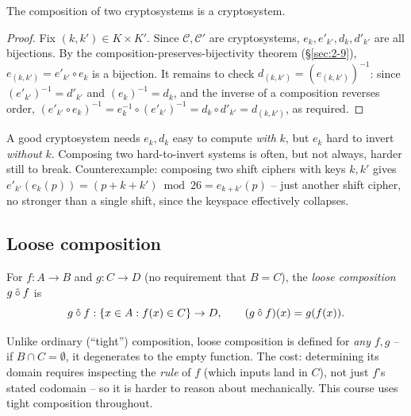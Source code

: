 \begin{proposition}
The composition of two cryptosystems is a cryptosystem.
\end{proposition}
\begin{proof}
Fix $(k,k') \in K \times K'$. Since $\mathcal{C}, \mathcal{C}'$ are cryptosystems, $e_k, e'_{k'}, d_k, d'_{k'}$ are all bijections. By the composition-preserves-bijectivity theorem (\S\ref{sec:2-9}), $e_{(k,k')} = e'_{k'} \circ e_k$ is a bijection. It remains to check $d_{(k,k')} = (e_{(k,k')})^{-1}$: since $(e'_{k'})^{-1} = d'_{k'}$ and $(e_k)^{-1} = d_k$, and the inverse of a composition reverses order, $(e'_{k'}\circ e_k)^{-1} = e_k^{-1} \circ (e'_{k'})^{-1} = d_k \circ d'_{k'} = d_{(k,k')}$, as required.
\end{proof}

\begin{note}
A good cryptosystem needs $e_k, d_k$ easy to compute \emph{with} $k$, but $e_k$ hard to invert \emph{without} $k$. Composing two hard-to-invert systems is often, but not always, harder still to break. Counterexample: composing two shift ciphers with keys $k,k'$ gives $e'_{k'}(e_k(p)) = (p+k+k') \bmod 26 = e_{k+k'}(p)$ -- just another shift cipher, no stronger than a single shift, since the keyspace effectively collapses.
\end{note}

\subsection{Loose composition}
\label{sec:2-11}

\begin{definition}
For $f: A \to B$ and $g: C \to D$ (no requirement that $B = C$), the \emph{loose composition} $g \mathbin{\mathaccent"705E\relax\circ} f$ is
\[
g \mathbin{\mathaccent"705E\relax\circ} f : \{x \in A : f(x) \in C\} \to D, \qquad (g \mathbin{\mathaccent"705E\relax\circ} f)(x) = g(f(x)).
\]
\end{definition}

\begin{note}
Unlike ordinary (``tight'') composition, loose composition is defined for \emph{any} $f,g$ -- if $B \cap C = \emptyset$, it degenerates to the empty function. The cost: determining its domain requires inspecting the \emph{rule} of $f$ (which inputs land in $C$), not just $f$'s stated codomain -- so it is harder to reason about mechanically. This course uses tight composition throughout.
\end{note}

